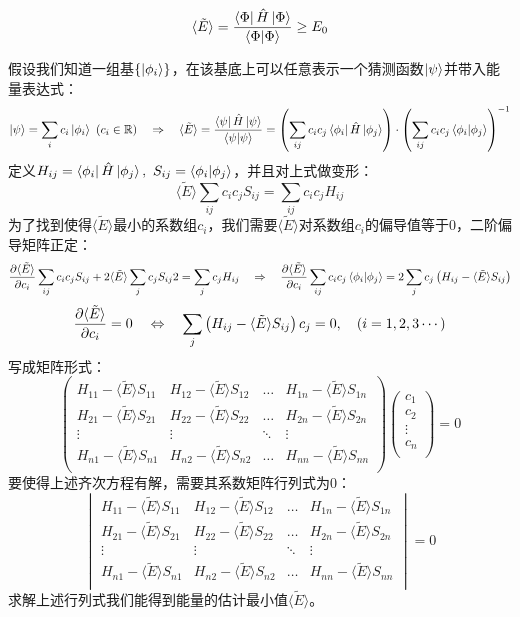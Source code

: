 \[\langle\tilde{E}\rangle=\frac{\bra{\Phi}\hat{H}\ket{\Phi}}{\bra{\Phi}\ket{\Phi}} \geq E_0\]

假设我们知道一组基$\{\ket{\phi_i}\}$，在该基底上可以任意表示一个猜测函数$\ket{\psi}$并带入能量表达式：
\[\ket{\psi}=\sum_ic_i\ket{\phi_i} \ (c_i\in\mathbb{R}) \quad \Rightarrow \quad \langle\tilde{E}\rangle=\frac{\bra{\psi}\hat{H}\ket{\psi}}{\bra{\psi}\ket{\psi}}=\left(\sum_{ij}c_ic_j\bra{\phi_i}\hat{H}\ket{\phi_j}\right)\cdot\left(\sum_{ij}c_ic_j\bra{\phi_i}\ket{\phi_j}\right)^{-1}\]
定义$H_{ij}=\bra{\phi_i}\hat{H}\ket{\phi_j}, \ S_{ij}=\bra{\phi_i}\ket{\phi_j}$，并且对上式做变形：
\[\langle\tilde{E}\rangle\sum_{ij}c_ic_jS_{ij}=\sum_{ij}c_ic_jH_{ij}\]
为了找到使得$\langle\tilde{E}\rangle$最小的系数组$c_i$，我们需要$\langle\tilde{E}\rangle$对系数组$c_i$的偏导值等于0，二阶偏导矩阵正定：
\[\pdv{\langle\tilde{E}\rangle}{c_i}\sum_{ij}c_ic_jS_{ij}+2\langle\tilde{E}\rangle\sum_{j}c_jS_{ij}2=\sum_{j}c_jH_{ij} \quad \Rightarrow \quad \pdv{\langle\tilde{E}\rangle}{c_i}\sum_{ij}c_ic_j\bra{\phi_i}\ket{\phi_j}=2\sum_{j}c_j\left(H_{ij}-\langle\tilde{E}\rangle S_{ij}\right)\]
\[\pdv{\langle\tilde{E}\rangle}{c_i}=0 \quad \Leftrightarrow \quad \sum_{j}\left(H_{ij}-\langle\tilde{E}\rangle S_{ij}\right)c_j=0, \quad (i=1,2,3 \cdots)\]
写成矩阵形式：
\[\begin{pmatrix}
H_{11}-\langle\tilde{E}\rangle S_{11} & H_{12}-\langle\tilde{E}\rangle S_{12} & \ldots & H_{1n}-\langle\tilde{E}\rangle S_{1n}\\
H_{21}-\langle\tilde{E}\rangle S_{21} & H_{22}-\langle\tilde{E}\rangle S_{22} & \ldots & H_{2n}-\langle\tilde{E}\rangle S_{2n}\\
\vdots & \vdots & \ddots & \vdots\\
H_{n1}-\langle\tilde{E}\rangle S_{n1} & H_{n2}-\langle\tilde{E}\rangle S_{n2} & \ldots & H_{nn}-\langle\tilde{E}\rangle S_{nn}\\
\end{pmatrix}
\begin{pmatrix}
c_1\\c_2\\\vdots\\c_n\\
\end{pmatrix}
=0\]
要使得上述齐次方程有解，需要其系数矩阵行列式为0：
\[\begin{vmatrix}
H_{11}-\langle\tilde{E}\rangle S_{11} & H_{12}-\langle\tilde{E}\rangle S_{12} & \ldots & H_{1n}-\langle\tilde{E}\rangle S_{1n}\\
H_{21}-\langle\tilde{E}\rangle S_{21} & H_{22}-\langle\tilde{E}\rangle S_{22} & \ldots & H_{2n}-\langle\tilde{E}\rangle S_{2n}\\
\vdots & \vdots & \ddots & \vdots\\
H_{n1}-\langle\tilde{E}\rangle S_{n1} & H_{n2}-\langle\tilde{E}\rangle S_{n2} & \ldots & H_{nn}-\langle\tilde{E}\rangle S_{nn}\\
\end{vmatrix}=0\]
求解上述行列式我们能得到能量的估计最小值$\langle\tilde{E}\rangle$。

